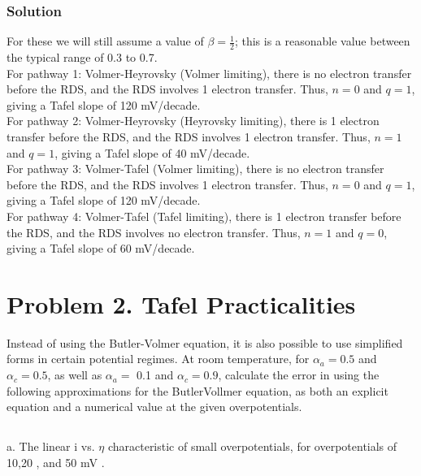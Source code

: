 \documentclass[12pt]{article}
\begin{document}
\subsubsection{Solution}
For these we will still assume a value of $\beta = \frac{1}{2}$; this is a reasonable value between the typical range of 0.3 to 0.7.\\
For pathway 1: Volmer-Heyrovsky (Volmer limiting), there is no electron transfer before the RDS, and the RDS involves 1 electron transfer. Thus, $n=0$ and $q=1$, giving a Tafel slope of 120 mV/decade.\\
For pathway 2: Volmer-Heyrovsky (Heyrovsky limiting), there is 1 electron transfer before the RDS, and the RDS involves 1 electron transfer. Thus, $n=1$ and $q=1$, giving a Tafel slope of 40 mV/decade.\\
For pathway 3: Volmer-Tafel (Volmer limiting), there is no electron transfer before the RDS, and the RDS involves 1 electron transfer. Thus, $n=0$ and $q=1$, giving a Tafel slope of 120 mV/decade.\\
For pathway 4: Volmer-Tafel (Tafel limiting), there is 1 electron transfer before the RDS, and the RDS involves no electron transfer. Thus, $n=1$ and $q=0$, giving a Tafel slope of 60 mV/decade.\\


\section{Problem 2. Tafel Practicalities}
Instead of using the Butler-Volmer equation, it is also possible to use simplified forms in certain potential regimes. At room temperature, for $\alpha_{a}=0.5$ and $\alpha_{c}=0.5$, as well as $\alpha_{a}=$ 0.1 and $\alpha_{c}=0.9$, calculate the error in using the following approximations for the ButlerVollmer equation, as both an explicit equation and a numerical value at the given overpotentials.\\
\subsection{}
a. The linear i vs. $\eta$ characteristic of small overpotentials, for overpotentials of 10,20 , and 50 mV .\\
\end{document}
